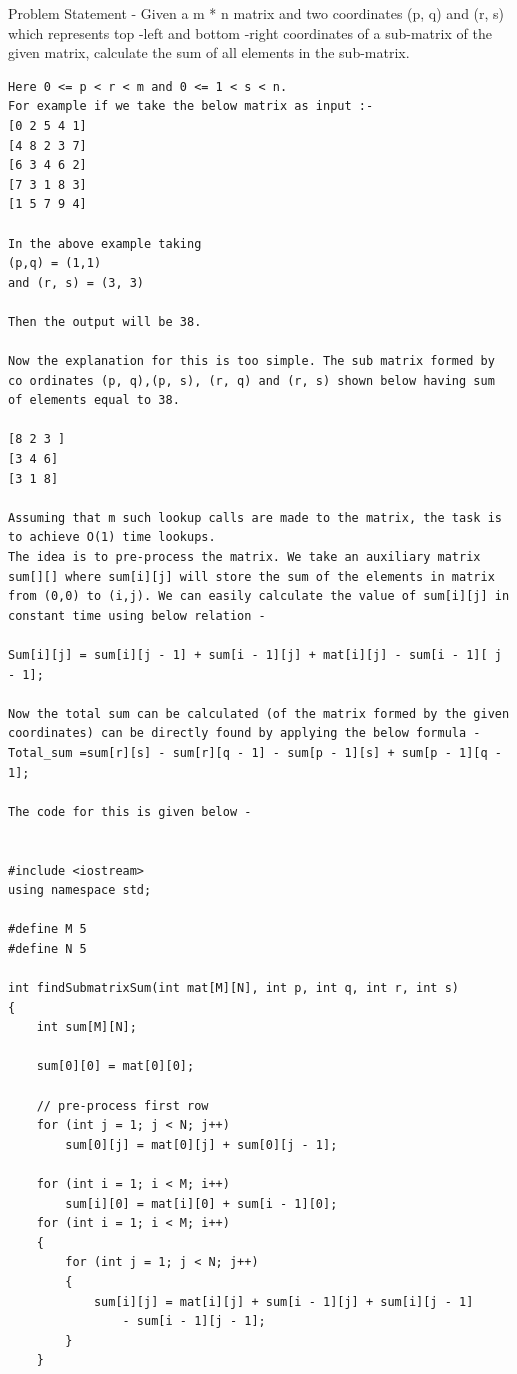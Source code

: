 \documentclass[12pt]{book}
\begin{document}
Problem Statement - Given  a m * n matrix and two coordinates (p, q) and (r, s) which represents top -left and bottom -right coordinates of a sub-matrix of the given matrix, calculate the sum of all elements in the sub-matrix.\\
\newline
\begin{lstlisting}
Here 0 <= p < r < m and 0 <= 1 < s < n.
For example if we take the below matrix as input :-
[0 2 5 4 1]
[4 8 2 3 7]
[6 3 4 6 2]
[7 3 1 8 3]
[1 5 7 9 4]
 
In the above example taking
(p,q) = (1,1)
and (r, s) = (3, 3)

Then the output will be 38.

Now the explanation for this is too simple. The sub matrix formed by co ordinates (p, q),(p, s), (r, q) and (r, s) shown below having sum of elements equal to 38.

[8 2 3 ]
[3 4 6]
[3 1 8]

Assuming that m such lookup calls are made to the matrix, the task is to achieve O(1) time lookups.
The idea is to pre-process the matrix. We take an auxiliary matrix sum[][] where sum[i][j] will store the sum of the elements in matrix from (0,0) to (i,j). We can easily calculate the value of sum[i][j] in constant time using below relation -

Sum[i][j] = sum[i][j - 1] + sum[i - 1][j] + mat[i][j] - sum[i - 1][ j - 1];

Now the total sum can be calculated (of the matrix formed by the given coordinates) can be directly found by applying the below formula -
Total_sum =sum[r][s] - sum[r][q - 1] - sum[p - 1][s] + sum[p - 1][q - 1];

The code for this is given below -


#include <iostream>
using namespace std;

#define M 5
#define N 5

int findSubmatrixSum(int mat[M][N], int p, int q, int r, int s)
{
    int sum[M][N];

    sum[0][0] = mat[0][0];

    // pre-process first row
    for (int j = 1; j < N; j++)
        sum[0][j] = mat[0][j] + sum[0][j - 1];

    for (int i = 1; i < M; i++)
        sum[i][0] = mat[i][0] + sum[i - 1][0];
    for (int i = 1; i < M; i++)
    {
        for (int j = 1; j < N; j++)
        {
            sum[i][j] = mat[i][j] + sum[i - 1][j] + sum[i][j - 1]
                - sum[i - 1][j - 1];
        }
    }


\end{lstlisting}
\end{document}
